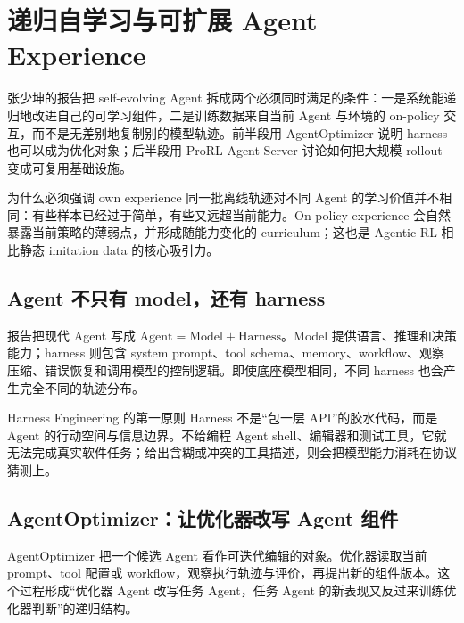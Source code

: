 \section{递归自学习与可扩展 Agent Experience}

张少坤的报告把 self-evolving Agent 拆成两个必须同时满足的条件：一是系统能递归地改进自己的可学习组件，二是训练数据来自当前 Agent 与环境的 on-policy 交互，而不是无差别地复制别的模型轨迹。前半段用 AgentOptimizer 说明 harness 也可以成为优化对象；后半段用 ProRL Agent Server 讨论如何把大规模 rollout 变成可复用基础设施。


\begin{importantbox}{为什么必须强调 own experience}
同一批离线轨迹对不同 Agent 的学习价值并不相同：有些样本已经过于简单，有些又远超当前能力。On-policy experience 会自然暴露当前策略的薄弱点，并形成随能力变化的 curriculum；这也是 Agentic RL 相比静态 imitation data 的核心吸引力。
\end{importantbox}

\subsection{Agent 不只有 model，还有 harness}

报告把现代 Agent 写成 $\text{Agent}=\text{Model}+\text{Harness}$。Model 提供语言、推理和决策能力；harness 则包含 system prompt、tool schema、memory、workflow、观察压缩、错误恢复和调用模型的控制逻辑。即使底座模型相同，不同 harness 也会产生完全不同的轨迹分布。


\begin{knowledgebox}{Harness Engineering 的第一原则}
Harness 不是“包一层 API”的胶水代码，而是 Agent 的行动空间与信息边界。不给编程 Agent shell、编辑器和测试工具，它就无法完成真实软件任务；给出含糊或冲突的工具描述，则会把模型能力消耗在协议猜测上。
\end{knowledgebox}

\subsection{AgentOptimizer：让优化器改写 Agent 组件}

AgentOptimizer 把一个候选 Agent 看作可迭代编辑的对象。优化器读取当前 prompt、tool 配置或 workflow，观察执行轨迹与评价，再提出新的组件版本。这个过程形成“优化器 Agent 改写任务 Agent，任务 Agent 的新表现又反过来训练优化器判断”的递归结构。

